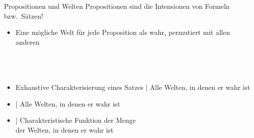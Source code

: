 \begin{frame}
  {Propositionen und Welten}
  \onslide<+->
  \onslide<+->
  Propositionen sind die Intensionen von Formeln bzw.\ Sätzen!\\
  \Halbzeile
  \begin{itemize}[<+->]
    \item Eine mögliche Welt für jede Proposition als wahr, permutiert mit allen anderen\\
      \\
      \\
      \\
    \item Exhaustive Charakterisierung eines Satzes | \alert{Alle Welten, in denen er wahr ist}
    \item {} | \alert{Alle Welten, in denen er wahr ist}
      \Halbzeile
    \item {} | \alert{Charakteristische Funktion} der Menge\\
      der \alert{Welten, in denen er wahr ist} 
  \end{itemize}
\end{frame}

